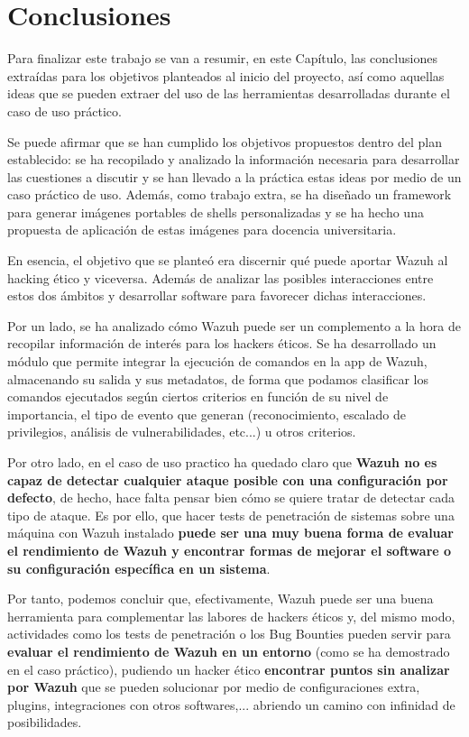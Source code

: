 \chapter{Conclusiones}

Para finalizar este trabajo se van a resumir, en este Capítulo, las conclusiones extraídas para los objetivos planteados al inicio del proyecto, así como aquellas ideas que se pueden extraer del uso de las herramientas desarrolladas durante el caso de uso práctico.

Se puede afirmar que se han cumplido los objetivos propuestos dentro del plan establecido: se ha recopilado y analizado la información necesaria para desarrollar las cuestiones a discutir y se han llevado a la práctica estas ideas por medio de un caso práctico de uso. Además, como trabajo extra, se ha diseñado un framework para generar imágenes portables de shells personalizadas y se ha hecho una propuesta de aplicación de estas imágenes para docencia universitaria.

En esencia, el objetivo que se planteó era discernir qué puede aportar Wazuh al hacking ético y viceversa. Además de analizar las posibles interacciones entre estos dos ámbitos y desarrollar software para favorecer dichas interacciones.

Por un lado, se ha analizado cómo Wazuh puede ser un complemento a la hora de recopilar información de interés para los hackers éticos. Se ha desarrollado un módulo que permite integrar la ejecución de comandos en la app de Wazuh, almacenando su salida y sus metadatos, de forma que podamos clasificar los comandos ejecutados según ciertos criterios en función de su nivel de importancia, el tipo de evento que generan (reconocimiento, escalado de privilegios, análisis de vulnerabilidades, etc...) u otros criterios.

Por otro lado, en el caso de uso practico ha quedado claro que \textbf{Wazuh no es capaz de detectar cualquier ataque posible con una configuración por defecto}, de hecho, hace falta pensar bien cómo se quiere tratar de detectar cada tipo de ataque. Es por ello, que hacer tests de penetración de sistemas sobre una máquina con Wazuh instalado \textbf{puede ser una muy buena forma de evaluar el rendimiento de Wazuh y encontrar formas de mejorar el software o su configuración específica en un sistema}.

Por tanto, podemos concluir que, efectivamente, Wazuh puede ser una buena herramienta para complementar las labores de hackers éticos y, del mismo modo, actividades como los tests de penetración o los Bug Bounties pueden servir para \textbf{evaluar el rendimiento de Wazuh en un entorno} (como se ha demostrado en el caso práctico), pudiendo un hacker ético \textbf{encontrar puntos sin analizar por Wazuh} que se pueden solucionar por medio de configuraciones extra, plugins, integraciones con otros softwares,... abriendo un camino con infinidad de posibilidades.

